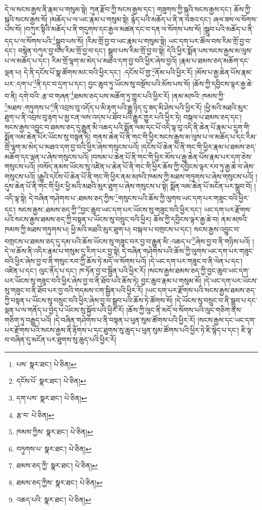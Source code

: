དེ་ལ་སངས་རྒྱས་ནི་རྣམ་པ་གསུམ་སྟེ། ཀུན་རྫོབ་ཀྱི་སངས་རྒྱས་དང་། གཟུགས་ཀྱི་སྐུའི་སངས་རྒྱས་དང་། ཆོས་ཀྱི་སྐུའི་སངས་རྒྱས་སོ། །མཆོད་པ་ལ་ཡང་རྣམ་པ་གསུམ་སྟེ། རྙེད་པའི་མཆོད་པ་ནི་ན་བཟའ་དང་། ཞལ་ཟས་ལ་སོགས་པས་སོ། །བཀུར་སྟིའི་མཆོད་པ་ནི་གདུགས་དང་རྒྱལ་མཚན་དང་བ་དན་ལ་སོགས་པས་སོ། །སྒྲུབ་པའི་མཆོད་པ་ནི་དད་པ་ལ་སོགས་པའི་\footnote{པས་  སྣར་ཐང་།  པེ་ཅིན། }སྒྲུབ་པས་སོ། །རིམ་གྲོ་བྱ་བ་ཡང་རྣམ་པ་གསུམ་སྟེ། ཡང་དག་པར་ཚོལ་བས་རིམ་གྲོ་བྱ་བ་དང་། བསྙེན་བཀུར་བྱ་བས་རིམ་གྲོ་བྱ་བ་དང་། སྒྲུབ་པས་རིམ་གྲོ་བྱ་བ་སྟེ། དེའི་ཕྱིར་སྨོན་པས་སངས་རྒྱས་མ་ལུས་པ་ལ་མཆོད་པ་དང་། རིམ་གྲོ་ལྷག་མ་མེད་པ་མཐའ་དག་བྱ་བའི་ཕྱིར་ཞེས་བྱའོ། །རྣམ་པ་ཐམས་ཅད་མཆོག་དང་ལྡན་པ། དེ་ནི་དངོས་པོ་སྣ་ཚོགས་མང་བའི་ཕྱིར་དང་། :དངོས་པོ་གྱ་\footnote{དངོས་པོ་  སྣར་ཐང་།  པེ་ཅིན། }ནོམ་པའི་ཕྱིར་རོ། །མོས་པ་རྒྱ་ཆེན་པོས་རྣམ་པར་:དག་པ་\footnote{དག་པས་  སྣར་ཐང་།  པེ་ཅིན། }ནི་དང་བ་དྲག་པ་དང་། བྱང་ཆུབ་ཏུ་ཡོངས་སུ་བསྔོས་པའི་མོས་པས་སོ། །ཆོས་ཀྱི་དབྱིངས་ལྟར་རྒྱ་ཆེ་བ་ནི། དགེ་བའི་:རྩ་བ་གཞན་\footnote{རྩ་བ་  པེ་ཅིན། }ཐམས་ཅད་པས་མཆོག་ཏུ་གྱུར་པའི་ཕྱིར་རོ། །ནམ་མཁའི་:ཁམས་ཀྱི་\footnote{ཁམས་ཀྱིས་  སྣར་ཐང་།  པེ་ཅིན། }མཐས་:གཏུགས་པ་\footnote{བཏུགས་པ་  སྣར་ཐང་།  པེ་ཅིན། }ནི་འབྲས་བུ་འདོད་པ་མི་རྟག་པའི་རྒྱུ་ཉིད་དུ་ཟད་མི་ཤེས་པའི་ཕྱིར་རོ། །ཕྱི་མའི་མཐའི་མུར་ཐུག་པ་ནི་འབྲས་བུ་རྟག་པ་མྱ་ངན་ལས་འདས་པ་ཐོབ་པའི་རྒྱུར་གྱུར་པའི་ཕྱིར་ཏེ། བསྐལ་པ་ཐམས་ཅད་དང་། སངས་རྒྱས་འབྱུང་བ་ཐམས་ཅད་དུ་རྒྱུན་མི་འཆད་པའི་སྨོན་ལམ་དང་པོ་འདི་ལྟ་བུ་འདི་ནི་ཆེན་པོ་རྣམ་པ་དྲུག་གི་སྨོན་ལམ་ཆེན་པོར་ཡོངས་སུ་བསྟན་ཏེ། གནས་ཆེན་པོ་ནི་གང་གི་ཕྱིར་སངས་རྒྱས་མ་ལུས་པ་ལ་མཆོད་པ་དང་རིམ་གྲོ་ལྷག་མ་མེད་པ་མཐའ་དག་བྱ་བའི་ཕྱིར་ཞེས་གསུངས་པའོ། །དངོས་པོ་ཆེན་པོ་ནི་གང་གི་ཕྱིར་རྣམ་པ་ཐམས་ཅད་མཆོག་དང་ལྡན་པ་ཞེས་གསུངས་པའོ། །བསམ་པ་ཆེན་པོ་ནི་གང་གི་ཕྱིར་མོས་པ་རྒྱ་ཆེན་པོས་རྣམ་པར་དག་ཅེས་གསུངས་པའོ། །བསོད་ནམས་ཡོངས་སུ་འཛིན་པ་ཆེན་པོ་ནི་གང་གི་ཕྱིར་ཆོས་ཀྱི་དབྱིངས་ལྟར་རབ་ཏུ་རྒྱ་ཆེ་བ་ཞེས་གསུངས་པའོ། །རྒྱུའི་དངོས་པོ་ཆེན་པོ་ནི་གང་གི་ཕྱིར་ནམ་མཁའི་ཁམས་ཀྱི་མཐས་གཏུགས་པ་ཞེས་གསུངས་པའོ། །དུས་ཆེན་པོ་ནི་གང་གི་ཕྱིར་ཕྱི་མའི་མཐའི་མུར་ཐུག་པ་ཞེས་གསུངས་པ་སྟེ། སྨོན་ལམ་ཆེན་པོ་མངོན་པར་སྒྲུབ་བོ། །འདི་ལྟ་སྟེ། དེ་བཞིན་གཤེགས་པ་:ཐམས་ཅད་ཀྱིས་\footnote{ཐམས་ཅད་ཀྱི་  སྣར་ཐང་།  པེ་ཅིན། }གསུངས་པའི་ཆོས་ཀྱི་ལུགས་ཡང་དག་པར་གཟུང་བའི་ཕྱིར་དང་། སངས་རྒྱས་:ཐམས་ཅད་ཀྱི་\footnote{ཐམས་ཅད་ཀྱིས་  སྣར་ཐང་།  པེ་ཅིན། }བྱང་ཆུབ་ཡང་དག་པར་ཡོངས་སུ་གཟུང་བའི་ཕྱིར་དང་། ཡང་དག་པར་རྫོགས་པའི་སངས་རྒྱས་ཐམས་ཅད་ཀྱི་བསྟན་པ་ཡོངས་སུ་བསྲུང་བའི་ཕྱིར། ཆོས་ཀྱི་དབྱིངས་ལྟར་རྒྱ་ཆེ་བ། ནམ་མཁའི་ཁམས་ཀྱི་མཐས་གཏུགས་པ། ཕྱི་མའི་མཐའི་མུར་ཐུག་པ། བསྐལ་པ་བགྲངས་པ་དང་། སངས་རྒྱས་འབྱུང་བ་བགྲངས་པ་ཐམས་ཅད་དུ་དམ་པའི་ཆོས་ཡོངས་སུ་གཟུང་བར་བྱ་བ་རྒྱུན་མི་:འཆད་པ་\footnote{འཆད་པའི་  སྣར་ཐང་།  པེ་ཅིན། }ཞེས་བྱ་བ་ནི་གཉིས་པའོ། །དེ་ལ་ཆོས་ནི་འདིར་རྣམ་པ་གསུམ་དུ་རིག་པར་བྱ་སྟེ། དེ་བཞིན་གཤེགས་པའི་ཆོས་ཀྱི་ལུགས་ཡང་དག་པར་གཟུང་བའི་ཕྱིར་ཞེས་བྱ་བ་ནི་གསུང་རབ་ཀྱི་ཆོས་ཏེ་མདོ་ལ་སོགས་པའོ། །དེ་ཡང་དག་པར་གཟུང་བ་ནི་ལེན་པ་དང་། འཛིན་པ་དང་། ལུང་ནོད་པ་དང་། ཁ་ཏོན་བྱ་བ་སྦྱིན་པའི་ཕྱིར་རོ། །སངས་རྒྱས་ཐམས་ཅད་ཀྱི་བྱང་ཆུབ་ཡང་དག་པར་ཡོངས་སུ་གཟུང་བའི་ཕྱིར་ཞེས་བྱ་བ་ནི་ཐོབ་པའི་ཆོས་ཏེ། བྱང་ཆུབ་རྣམ་པ་གསུམ་མོ། །དེ་ཡང་དག་པར་ཡོངས་སུ་གཟུང་བ་ནི་ཐོབ་པར་བྱ་བའི་གདམས་ངག་སྦྱིན་པའི་ཕྱིར་རོ། །ཡང་དག་པར་རྫོགས་པའི་སངས་རྒྱས་ཐམས་ཅད་ཀྱི་བསྟན་པ་ཡོངས་སུ་བསྲུང་བའི་ཕྱིར་ཞེས་བྱ་བ་སྒྲུབ་པའི་ཆོས་ཏེ་ཚོགས་སོ། །དེ་ཡོངས་སུ་བསྲུང་བ་ནི་སྒྲུབ་པ་དང་ལྡན་པ་ལ་གནོད་པ་བྱེད་པ་ཡོངས་སུ་སྐྱོབ་པའི་ཕྱིར་རོ། །ཆོས་ཀྱི་ལུང་ནི་མདོ་ལ་སོགས་པའི་ལུང་གཅིག་ནས་གཅིག་ཏུ་བརྒྱུད་པའོ། །དེ་བཞིན་གཤེགས་པ་ནི་བསྟན་པ་ཕུན་སུམ་ཚོགས་པའི་ཕྱིར་རོ། །སངས་རྒྱས་དང་ཡང་དག་པར་རྫོགས་པའི་སངས་རྒྱས་ནི་རྟོགས་པ་དང་ཐུགས་སུ་ཆུད་པ་ཕུན་སུམ་ཚོགས་པའི་ཕྱིར་ཏེ་ཇི་སྙེད་པ་དང་། ཇི་ལྟ་བ་བཞིན་དུ་མངོན་པར་ཐུགས་སུ་ཆུད་པའི་ཕྱིར་རོ། 